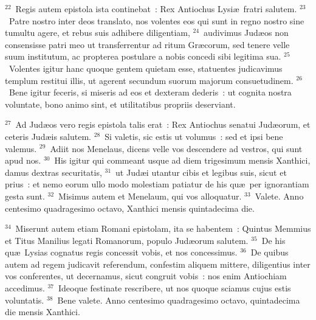 ${}^{22}$~Regis autem epistola ista continebat~: Rex Antiochus Lysi\ae\ fratri salutem.
${}^{23}$~Patre nostro inter deos translato, nos volentes eos qui sunt in regno nostro sine tumultu agere, et rebus suis adhibere diligentiam,
${}^{24}$~audivimus Jud\ae os non consensisse patri meo ut transferrentur ad ritum Gr\ae corum, sed tenere velle suum institutum, ac propterea postulare a nobis concedi sibi legitima sua.
${}^{25}$~Volentes igitur hanc quoque gentem quietam esse, statuentes judicavimus templum restitui illis, ut agerent secundum suorum majorum consuetudinem.
${}^{26}$~Bene igitur feceris, si miseris ad eos et dexteram dederis~: ut cognita nostra voluntate, bono animo sint, et utilitatibus propriis deserviant.


${}^{27}$~Ad Jud\ae os vero regis epistola talis erat~: Rex Antiochus senatui Jud\ae orum, et ceteris Jud\ae is salutem.
${}^{28}$~Si valetis, sic estis ut volumus~: sed et ipsi bene valemus.
${}^{29}$~Adiit nos Menelaus, dicens velle vos descendere ad vestros, qui sunt apud nos.
${}^{30}$~His igitur qui commeant usque ad diem trigesimum mensis Xanthici, damus dextras securitatis,
${}^{31}$~ut Jud\ae i utantur cibis et legibus suis, sicut et prius~: et nemo eorum ullo modo molestiam patiatur de his qu\ae\ per ignorantiam gesta sunt.
${}^{32}$~Misimus autem et Menelaum, qui vos alloquatur.
${}^{33}$~Valete. Anno centesimo quadragesimo octavo, Xanthici mensis quintadecima die.


${}^{34}$~Miserunt autem etiam Romani epistolam, ita se habentem~: Quintus Memmius et Titus Manilius legati Romanorum, populo Jud\ae orum salutem.
${}^{35}$~De his qu\ae\ Lysias cognatus regis concessit vobis, et nos concessimus.
${}^{36}$~De quibus autem ad regem judicavit referendum, confestim aliquem mittere, diligentius inter vos conferentes, ut decernamus, sicut congruit vobis~: nos enim Antiochiam accedimus.
${}^{37}$~Ideoque festinate rescribere, ut nos quoque sciamus cujus estis voluntatis.
${}^{38}$~Bene valete. Anno centesimo quadragesimo octavo, quintadecima die mensis Xanthici.

